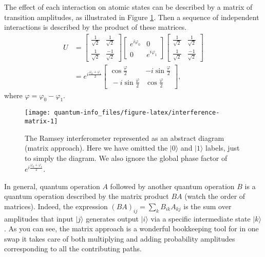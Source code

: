 \documentclass[fleqn]{article}
\begin{document}
The effect of each interaction on atomic states can be described by a matrix of transition amplitudes, as illustrated in Figure \ref{fig:interference-matrix}.
Then a sequence of independent interactions is described by the product of these matrices.
\[
  \begin{aligned}
    U &=
    \begin{bmatrix}
      \frac{1}{\sqrt2} & \frac{1}{\sqrt2}
    \\\frac{1}{\sqrt2} & \frac{-1}{\sqrt2}
    \end{bmatrix}
    \begin{bmatrix}
      e^{i\varphi_0} & 0
    \\0 & e^{i\varphi_1}
    \end{bmatrix}
    \begin{bmatrix}
      \frac{1}{\sqrt2} & \frac{1}{\sqrt2}
    \\\frac{1}{\sqrt2} & \frac{-1}{\sqrt2}
    \end{bmatrix}
  \\&= e^{i\frac{\varphi_0+\varphi_1}{2}}
    \begin{bmatrix}
      \cos\frac{\varphi}{2} & -i\sin\frac{\varphi}{2}
    \\\ -i\sin\frac{\varphi}{2}& \cos\frac{\varphi}{2}
    \end{bmatrix},
  \end{aligned}
\]
where \(\varphi = \varphi_0-\varphi_1\).



\begin{figure}[H]

{\centering \texttt{[image: quantum-info\_files/figure-latex/interference-matrix-1]} 

}

\caption{The Ramsey interferometer represented as an abstract diagram (matrix approach). Here we have omitted the \(|0\rangle\) and \(|1\rangle\) labels, just to simply the diagram. We also ignore the global phase factor of \(e^{i\frac{\varphi_0+\varphi_1}{2}}\).}\label{fig:interference-matrix}
\end{figure}

In general, quantum operation \(A\) followed by another quantum operation \(B\) is a quantum operation described by the matrix product \(BA\) (watch the order of matrices).
Indeed, the expression \((BA)_{ij}=\sum_k B_{ik}A_{kj}\) is the sum over amplitudes that input \(|j\rangle\) generates output \(|i\rangle\) via a specific intermediate state \(|k\rangle\).
As you can see, the matrix approach is a wonderful bookkeeping tool for in one swap it takes care of both multiplying and adding probability amplitudes corresponding to all the contributing paths.
\end{document}
